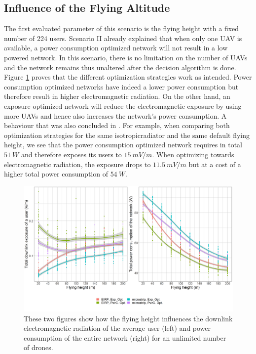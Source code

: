 \subsection{Influence of the Flying Altitude}
\label{S3A}
The first evaluated parameter of this scenario is the flying height
with a fixed number of 224 users.
Scenario II already explained that when only one \gls{UAV} is available, a power consumption optimized network will not result in a low 
powered network. In this scenario, there is no limitation on the number of \gls{UAV}s and the network remains thus unaltered after the decision 
algorithm is done. Figure \ref{fig:s3a_dlAndPc} proves that the different optimization strategies work as intended.
Power consumption optimized networks have indeed a lower power consumption but therefore result in higher electromagnetic radiation.
On the other hand, an exposure optimized network will reduce the electromagnetic exposure by using more \gls{UAV}s and hence also increases the network's power consumption.
A behaviour that was also concluded in \cite{J1}.
For example, when comparing both optimization strategies for the same \gls{isotropicradiator} and the same default flying height, we see that
the power consumption optimized network requires in total $51\ W$ and therefore exposes its users
to $15\ mV/m$. When optimizing towards electromagnetic radiation, the exposure drops to $11.5\ mV/m$ but at a cost of a higher total power consumption
of $54\ W$.
\begin{figure}[h!]
\centering
  \includegraphics[width=\textwidth]{../results/s3/fhvsdlAndPc.png}
  \caption{
    These two figures show how the flying height influences the downlink electromagnetic radiation of the average user (left) and 
  power consumption of the entire network (right) for an unlimited number of drones.
  }
     \label{fig:s3a_dlAndPc}
\end{figure}

